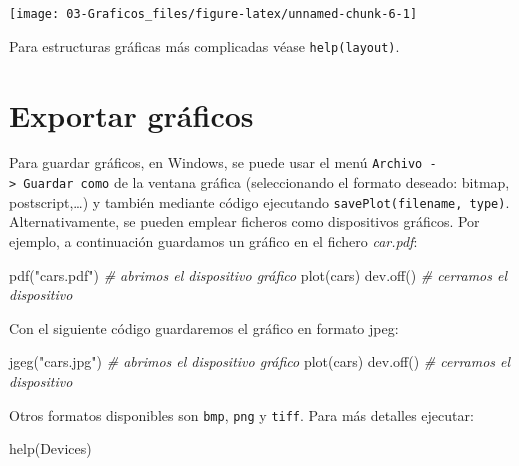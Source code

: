 \documentclass[
]{book}
\newenvironment{Shaded}{\begin{snugshade}}{\end{snugshade}}
\newcommand{\CommentTok}[1]{\textcolor[rgb]{0.56,0.35,0.01}{\textit{#1}}}
\newcommand{\FunctionTok}[1]{\textcolor[rgb]{0.00,0.00,0.00}{#1}}
\newcommand{\NormalTok}[1]{#1}
\newcommand{\StringTok}[1]{\textcolor[rgb]{0.31,0.60,0.02}{#1}}
\theoremstyle{break}
\begin{document}
\begin{center}\texttt{[image: 03-Graficos\_files/figure-latex/unnamed-chunk-6-1]} \end{center}

Para estructuras gráficas más complicadas véase \texttt{help(layout)}.

\hypertarget{exportar-gruxe1ficos}{%
\section{Exportar gráficos}\label{exportar-gruxe1ficos}}

Para guardar gráficos, en
Windows, se puede usar el menú \texttt{Archivo\ -\textgreater{}\ Guardar\ como} de la ventana gráfica (seleccionando el formato deseado: bitmap, postscript,\ldots) y también
mediante código ejecutando \texttt{savePlot(filename,\ type)}.
Alternativamente, se pueden emplear ficheros como dispositivos gráficos. Por ejemplo, a continuación guardamos un gráfico en el fichero \emph{car.pdf}:

\begin{Shaded}
\begin{Highlighting}[]
\FunctionTok{pdf}\NormalTok{(}\StringTok{"cars.pdf"}\NormalTok{)   }\CommentTok{\# abrimos el dispositivo gráfico}
\FunctionTok{plot}\NormalTok{(cars)}
\FunctionTok{dev.off}\NormalTok{()         }\CommentTok{\# cerramos el dispositivo}
\end{Highlighting}
\end{Shaded}

Con el siguiente código guardaremos el gráfico en formato jpeg:

\begin{Shaded}
\begin{Highlighting}[]
\FunctionTok{jgeg}\NormalTok{(}\StringTok{"cars.jpg"}\NormalTok{)  }\CommentTok{\# abrimos el dispositivo gráfico}
\FunctionTok{plot}\NormalTok{(cars)}
\FunctionTok{dev.off}\NormalTok{()         }\CommentTok{\# cerramos el dispositivo}
\end{Highlighting}
\end{Shaded}

Otros formatos disponibles son \texttt{bmp}, \texttt{png} y \texttt{tiff}. Para más detalles ejecutar:

\begin{Shaded}
\begin{Highlighting}[]
\FunctionTok{help}\NormalTok{(Devices)}
\end{Highlighting}
\end{Shaded}
\end{document}
